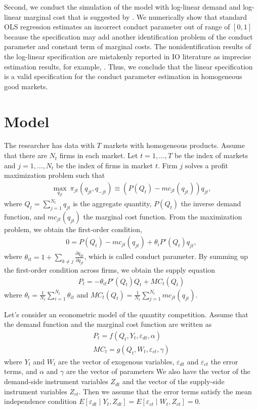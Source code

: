 \documentclass[11pt, a4paper]{article}
\begin{document}
Second, we conduct the simulation of the model with log-linear demand and log-linear marginal cost that is suggested by \cite{perloff2012collinearity}. 
We numerically show that standard OLS regression estimates an incorrect conduct parameter out of range of $[0,1]$ because the specification may add another identification problem of the conduct parameter and constant term of marginal costs. 
The nonidentification results of the log-linear specification are mistakenly reported in IO literature as imprecise estimation results, for example, \cite{okazaki2022excess}. 
Thus, we conclude that the linear specification is a valid specification for the conduct parameter estimation in homogeneous good markets.


\section{Model}
The researcher has data with $T$ markets with homogeneous products.
Assume that there are $N_t$ firms in each market.
Let $t = 1,\ldots, T$ be the index of markets and $j = 1, \ldots, N_t$ be the index of firms in market $t$.
Firm $j$ solves a profit maximization problem such that
\begin{align}
    \max_{q_{jt}} \ \pi_{jt}(q_{jt}, q_{-jt}) \equiv (P(Q_t) - mc_{jt}(q_{jt}))q_{jt},
\end{align}
where $Q_t = \sum_{j = 1}^{N_t} q_{jt}$ is the aggregate quantity, $P(Q_t)$ the inverse demand function, and $mc_{jt}(q_{jt})$ the marginal cost function.
From the maximization problem, we obtain the first-order condition,
\begin{align}
    0 = P(Q_{t}) - mc_{jt}(q_{jt}) + \theta_i P'(Q_{t})q_{jt},
\end{align}
where $\theta_{it} = 1 + \sum_{k\ne j}\frac{\partial q_{kt}}{\partial q_{jt}}$, which is called conduct parameter.
By summing up the first-order condition across firms, we obtain the supply equation 
\begin{align}
     P_t = -\theta_{it}P'(Q_{t})Q_t + MC_t(Q_t)
\end{align}
where $\theta_t = \frac{1}{N_t}\sum_{i = 1}^{N_t}\theta_{it}$ and $MC_t(Q_t) = \frac{1}{N_t}\sum_{j = 1}^{N_t} mc_{jt}(q_{jt})$.

Let's consider an econometric model of the quantity competition.
Assume that the demand function and the marginal cost function are written as 
\begin{align}
    P_t = f(Q_t, Y_t, \varepsilon_{dt}, \alpha)\\
    MC_t = g(Q_t, W_t, \varepsilon_{ct}, \gamma)
\end{align}
where $Y_t$ and $W_t$ are the vector of exogenous variables, $\varepsilon_{dt}$ and $\varepsilon_{ct}$ the error terms, and $\alpha$ and $\gamma$ are the vector of parameters
We also have the vector of the demand-side instrument variables $Z_{dt}$ and the vector of the supply-side instrument variables $Z_{ct}$.
Then we assume that the error terms satisfy the mean independence condition $E[\varepsilon_{dt}\mid Y_t, Z_{dt}] = E[\varepsilon_{ct} \mid W_t, Z_{ct}] =0$.
\end{document}
